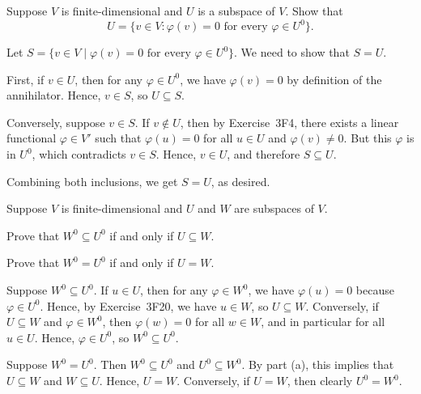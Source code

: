 \begin{exercise}
Suppose $V$ is finite-dimensional and $U$ is a subspace of $V$. Show that
\[ U = \{v\in V : \varphi(v)=0 \text{ for every } \varphi\in U^0\}. \]
\end{exercise}
\begin{solution}
Let $S=\{v\in V \mid \varphi(v)=0 \text{ for every } \varphi\in U^0\}$. We need
to show that $S=U$.

First, if $v\in U$, then for any $\varphi\in U^0$, we have $\varphi(v)=0$ by
definition of the annihilator. Hence, $v\in S$, so $U\subseteq S$.

Conversely, suppose $v\in S$. If $v\notin U$, then by Exercise~3F4, there
exists a linear functional $\varphi\in V'$ such that $\varphi(u)=0$ for all
$u\in U$ and $\varphi(v)\ne0$. But this $\varphi$ is in $U^0$, which
contradicts $v\in S$. Hence, $v\in U$, and therefore $S\subseteq U$.

Combining both inclusions, we get $S=U$, as desired.
\end{solution}

\begin{exercise}
Suppose $V$ is finite-dimensional and $U$ and $W$ are subspaces of $V$.
\begin{parts}
\item Prove that $W^0\subseteq U^0$ if and only if $U\subseteq W$.
\item Prove that $W^0=U^0$ if and only if $U=W$.
\end{parts}
\end{exercise}
\begin{solution}\leavevmode
\begin{parts}
\item Suppose $W^0\subseteq U^0$. If $u\in U$, then for any $\varphi\in W^0$,
  we have $\varphi(u)=0$ because $\varphi\in U^0$. Hence, by Exercise~3F20, we
  have $u\in W$, so $U\subseteq W$. Conversely, if $U\subseteq W$ and
  $\varphi\in W^0$, then $\varphi(w)=0$ for all $w\in W$, and in particular for
  all $u\in U$. Hence, $\varphi\in U^0$, so $W^0\subseteq U^0$.
\item Suppose $W^0=U^0$. Then $W^0\subseteq U^0$ and $U^0\subseteq W^0$. By
  part (a), this implies that $U\subseteq W$ and $W\subseteq U$. Hence, $U=W$.
  Conversely, if $U=W$, then clearly $U^0=W^0$.
\end{parts}
\end{solution}

